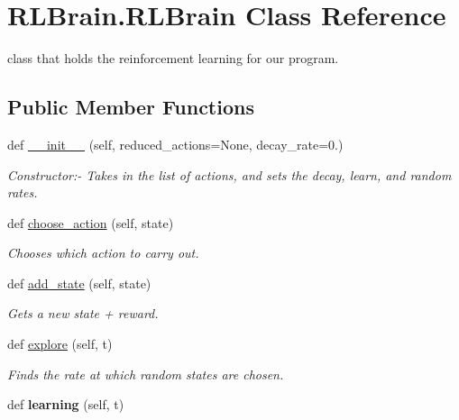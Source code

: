 \hypertarget{classRLBrain_1_1RLBrain}{}\section{R\+L\+Brain.\+R\+L\+Brain Class Reference}
\label{classRLBrain_1_1RLBrain}


class that holds the reinforcement learning for our program.  


\subsection*{Public Member Functions}
\begin{DoxyCompactItemize}
\item 
def \hyperlink{classRLBrain_1_1RLBrain_a40f979542aaadb4826a1b6ab8cb76fa9}{\+\_\+\+\_\+init\+\_\+\+\_\+} (self, reduced\+\_\+actions=None, decay\+\_\+rate=0.)
\begin{DoxyCompactList}\small\item\em Constructor\+:-\/ Takes in the list of actions, and sets the decay, learn, and random rates. \end{DoxyCompactList}\item 
def \hyperlink{classRLBrain_1_1RLBrain_a64d74e364a6d9fb49b888363dbd9f922}{choose\+\_\+action} (self, state)
\begin{DoxyCompactList}\small\item\em Chooses which action to carry out. \end{DoxyCompactList}\item 
def \hyperlink{classRLBrain_1_1RLBrain_af39e6aad4cc89b805c6cb09877db1e09}{add\+\_\+state} (self, state)
\begin{DoxyCompactList}\small\item\em Gets a new state + reward. \end{DoxyCompactList}\item 
def \hyperlink{classRLBrain_1_1RLBrain_a2cdec6a8eb09e6bb0f5c24251659ed56}{explore} (self, t)
\begin{DoxyCompactList}\small\item\em Finds the rate at which random states are chosen. \end{DoxyCompactList}\item 
def {\bfseries learning} (self, t)\hypertarget{classRLBrain_1_1RLBrain_a5cd8667073eafe18d7e9a42cda61606d}{}\label{classRLBrain_1_1RLBrain_a5cd8667073eafe18d7e9a42cda61606d}


\end{DoxyCompactItemize}
